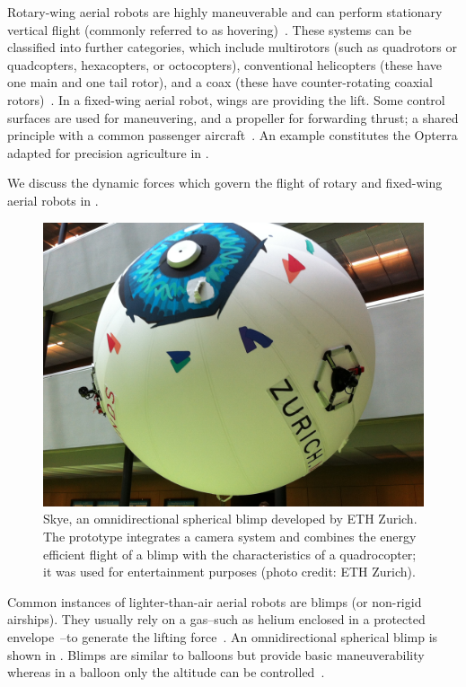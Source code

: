 Rotary-wing aerial robots are highly maneuverable and can perform stationary vertical flight (commonly referred to as hovering)~\citep{siciliano2016springer}. These systems can be classified into further categories, which include multirotors (such as quadrotors or quadcopters, hexacopters, or octocopters), conventional helicopters (these have one main and one tail rotor), and a coax (these have counter-rotating coaxial rotors)~\citep{corke2017robotics}. In a fixed-wing aerial robot, wings are providing the lift. Some control surfaces are used for maneuvering, and a propeller for forwarding thrust; a shared principle with a common passenger aircraft~\citep{corke2017robotics}. An example constitutes the Opterra adapted for precision agriculture in .

We discuss the dynamic forces which govern the flight of rotary and fixed-wing aerial robots in .

\begin{figure}[h]
  \centering
  \includegraphics[width=.7\textwidth]{pictures/IMG_2612}
  \caption[Skye, an omnidirectional spherical blimp]{Skye, an omnidirectional spherical blimp developed by ETH Zurich. The prototype integrates a camera system and combines the energy efficient flight of a blimp with the characteristics of a quadrocopter; it was used for entertainment purposes {\scriptsize(photo credit: ETH Zurich)}.}   
  \label{fig:skye-blimp}
\end{figure}

Common instances of lighter-than-air aerial robots are blimps (or non-rigid airships). They usually rely on a gas--such as helium enclosed in a protected envelope~\citep{burri2013design}--to generate the lifting force~\citep{fui2017recent}. An omnidirectional spherical blimp is shown in . Blimps are similar to balloons but provide basic maneuverability whereas in a balloon only the altitude can be controlled~\citep{colombatti2011lighter}.

